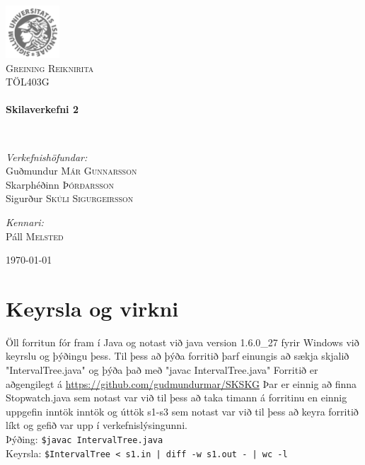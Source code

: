 \documentclass{article}
\begin{document}
\begin {titlepage}
\begin{center}
\includegraphics[width=0.15\textwidth]{./Haskoli_Islands_rett.jpg}~\\[1cm]

\textsc{\LARGE Greining Reiknirita}\\[1.5cm]

\textsc{\Large TÖL403G}\\[0.5cm]

\HRule \\[0.4cm]
{ \huge \bfseries Skilaverkefni 2\\[0.4cm] }

\HRule \\[1.5cm]

\begin{minipage}{0.5\textwidth}
\begin{flushleft} \large
\emph{Verkefnishöfundar:}
\\ Guðmundur\textsc{ Már Gunnarsson }
\\ Skarphéðinn \textsc{Þórðarsson}
\\ Sigurður \textsc{Skúli Sigurgeirsson}

\end{flushleft}
\end{minipage}
\begin{minipage}{0.4\textwidth}
\begin{flushright} \large
\emph{Kennari:} \\
Páll \textsc{Melsted}
\end{flushright}
\end{minipage}

\vfill

{\large \today}

\end{center}

\end{titlepage}

\section {Keyrsla og virkni}
Öll forritun fór fram í Java og notast við java version 1.6.0\_27 fyrir Windows við keyrslu og þýðingu þess. 
Til þess að þýða forritið þarf einungis að sækja skjalið "IntervalTree.java" og þýða það með "javac IntervalTree.java"
Forritið er aðgengilegt á \url{https://github.com/gudmundurmar/SKSKG}
Þar er einnig að finna Stopwatch.java sem notast var við til þess að taka timann á forritinu en einnig uppgefin inntök inntök og úttök s1-s3 sem notast var við til þess að keyra forritið líkt og gefið var upp í verkefnislýsingunni. 
\\ 	Þýðing: \texttt {\$javac IntervalTree.java}
\\ 	Keyrsla: \texttt {\$IntervalTree < s1.in | diff -w s1.out - | wc -l}
\end{document}
